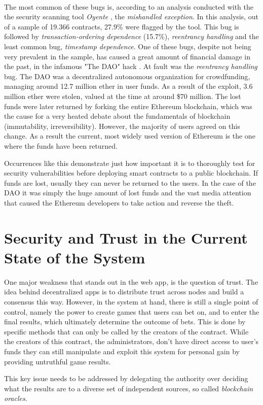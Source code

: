 \\
The most common of these bugs is, according to an analysis conducted with the the security scanning tool \emph{Oyente} \cite[p.~11]{luu2016making}, the \emph{mishandled exception}. In this analysis, out of a sample of 19.366 contracts, 27.9\% were flagged by the tool. This bug is followed by \emph{transaction-ordering dependence} (15.7\%), \emph{reentrancy handling} and the least common bug, \emph{timestamp dependence}. One of these bugs, despite not being very prevalent in the sample, has caused a great amount of financial damage in the past, in the infamous  "The DAO" hack \cite{thedao2017}. At fault was the \emph{reentrancy handling} bug. The DAO was a decentralized autonomous organization for crowdfunding, managing around 12.7 million ether in user funds. As a result of the exploit, 3.6 million ether were stolen, valued at the time at around \$70 million. The lost funds were later returned by forking the entire Ethereum blockchain, which was the cause for a very heated debate about the fundamentals of blockchain (immutability, irreversibility). However, the majority of users agreed on this change. As a result the current, most widely used version of Ethereum is the one where the funds have been returned.

Occurrences like this demonstrate just how important it is to thoroughly test for security vulnerabilities before deploying smart contracts to a public blockchain. If funds are lost, usually they can never be returned to the users. In the case of the DAO it was simply the huge amount of lost funds and the vast media attention that caused the Ethereum developers to take action and reverse the theft. 

\section{Security and Trust in the Current State of the System}
One major weakness that stands out in the web app, is the question of trust. The idea behind decentralized apps is to distribute trust across nodes and build a consensus this way. However, in the system at hand, there is still a single point of control, namely the power to create games that users can bet on, and to enter the final results, which ultimately determine the outcome of bets. This is done by specific methods that can only be called by the creators of the contract. While the creators of this contract, the administrators, don't have direct access to user's funds they can still manipulate and exploit this system for personal gain by providing untruthful game results.

This key issue needs to be addressed by delegating the authority over deciding what the results are to a diverse set of independent sources, so called \emph{blockchain oracles}.